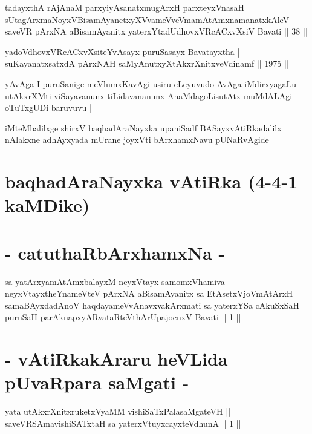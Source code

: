 \begin{shl}
tadayxthA rAjAnaM parxyiyAsanatxmugArxH parxteyxVnasaH sUtagArxmaNoyxV\s BisamAyanetxyXVvameVveVmamAtAmxnamanatxkAleV saveVR pArxNA aBisamAyanitx yaterxYtadUdhovxVRcACxvXsiV Bavati || 38 ||
\end{shl}

\begin{shl}
yadoVdhovxVRcACxvXsiteYvAsayx puruSasayx Bavatayxtha || \\
suKayanatxsatxdA pArxNAH saMyAnutxyXtAkxrXnitxveVdinamf ||  1975 ||  
\end{shl}

\begin{artha}
yAvAga I puruSanige meVlumxKavAgi usiru eLeyuvudo AvAga iMdirxyagaLu
utAkxrXMti viSayavanunx tiLidavananunx AnaMdagoLisutAtx muMdALAgi
oTuTxgUDi baruvuvu ||
\end{artha}

\begin{center}
iMteMbalilxge shirxV baqhadAraNayxka upaniSadf BASayxvAtiRkadalilx
nAlakxne adhAyxyada mUrane joyxVti bArxhamxNavu  pUNaRvAgide 
\end{center}

\section*{baqhadAraNayxka vAtiRka (4-4-1 kaMDike)}

\section*{- catuthaRbArxhamxNa -}

\begin{shl}
sa yatArxyamAtAmxbalayxM neyxVtayx samomxVhamiva neyxVtayxtheYnameVteV pArxNA aBisamAyanitx sa EtAsetxVjoVmAtArxH samaBAyxdadAnoV haqdayameVvAnavxvakArxmati sa yaterxYSa cAkuSxSaH puruSaH parAknapxyARvataRteV\s thArUpajocnxV Bavati || 1 ||
\end{shl}

\section*{- vAtiRkakAraru heVLida pUvaRpara saMgati -}


\begin{shl}
yata utAkxrXnitxruketxVyaMM vishiSaTxPalasaMgateVH || \\
saveVRSAmavishiSATx\s taH sa yaterxVtuyxcayxteV\s dhunA ||  1 ||  
\end{shl}

